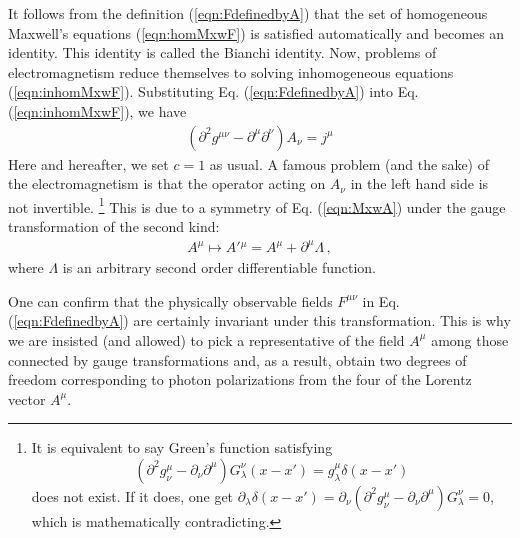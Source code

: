 It follows from the definition (\ref{eqn:FdefinedbyA}) that
the set of
homogeneous Maxwell's equations (\ref{eqn:homMxwF})
is satisfied automatically and becomes an identity.
This identity  is called the Bianchi identity.
Now, problems of electromagnetism reduce themselves to solving inhomogeneous
equations (\ref{eqn:inhomMxwF}). Substituting Eq. (\ref{eqn:FdefinedbyA}) into
Eq. (\ref{eqn:inhomMxwF}), we have
\begin{eqnarray}
(\partial^2 g^{\mu \nu} - \partial^\mu \partial^\nu) A_\nu = j^\mu
\label{eqn:MxwA}
\end{eqnarray}
Here and hereafter, we set $c = 1$ as usual.
A famous problem (and the sake) of the electromagnetism is that
the operator acting on $A_\nu$ in the left hand side
is not invertible.
\footnote{%
It is equivalent to say Green's function satisfying 
\[(\partial^2 g^\mu_\nu
 - \partial_\nu \partial^\mu) G^\nu_\lambda (x-x')=
 g^\mu_\lambda \delta(x -x')
\]
does not exist. If it does, one get
$\partial_\lambda \delta(x - x') = \partial_\nu 
(\partial^2 g^\mu_\nu - \partial_\nu \partial^\mu) G^\nu_\lambda
= 0$,
which is mathematically contradicting.}%
This is due to a symmetry of Eq. (\ref{eqn:MxwA}) under the gauge transformation
of the second kind:
\begin{eqnarray}
A^\mu \mapsto A'{}^{\mu} = A^\mu + \partial^\mu \Lambda\,,
\end{eqnarray}
where $\Lambda$ is an arbitrary second order differentiable function.
\begin{comment}
\end{comment}
One can confirm that the physically observable fields $F^{\mu \nu}$ in Eq. (\ref{eqn:FdefinedbyA}) 
are certainly invariant under this transformation. 
This is why we are insisted (and allowed) to pick a representative of the field $A^\mu$
among those connected by gauge transformations
and, as a result, obtain two degrees of freedom corresponding to photon polarizations
from the  four of the Lorentz vector $A^\mu$.

